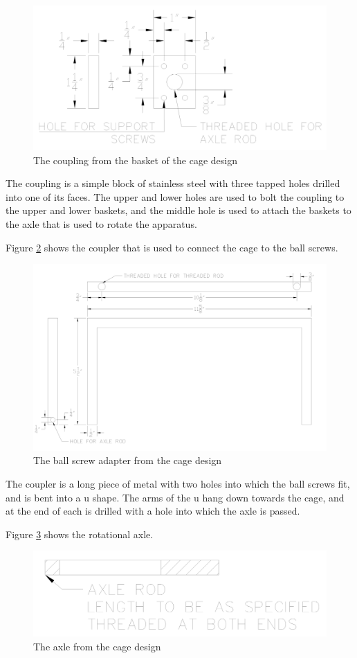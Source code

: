 \documentclass[11pt]{article}
\begin{document}
\begin{figure}[H]
  \centering
  \includegraphics[width=0.6\linewidth]{res/cage_coupling.png}
  \caption{The coupling from the basket of the cage design}
  \label{fig:cage coupling}
\end{figure}

The coupling is a simple block of stainless steel with three tapped holes drilled into one of its faces.
The upper and lower holes are used to bolt the coupling to the upper and lower baskets, and the middle hole is used to attach the baskets to the axle that is used to rotate the apparatus.

Figure \ref{fig:cage ball screw adapter} shows the coupler that is used to connect the cage to the ball screws.

\begin{figure}[H]
  \centering
  \includegraphics[width=0.6\linewidth]{res/cage_ball_screw_adapter.png}
  \caption{The ball screw adapter from the cage design}
  \label{fig:cage ball screw adapter}
\end{figure}

The coupler is a long piece of metal with two holes into which the ball screws fit, and is bent into a u shape.
The arms of the u hang down towards the cage, and at the end of each is drilled with a hole into which the axle is passed.

Figure \ref{fig:cage axle} shows the rotational axle.

\begin{figure}[H]
  \centering
  \includegraphics[width=0.4\linewidth]{res/cage_axle.png}
  \caption{The axle from the cage design}
  \label{fig:cage axle}
\end{figure}
\end{document}
